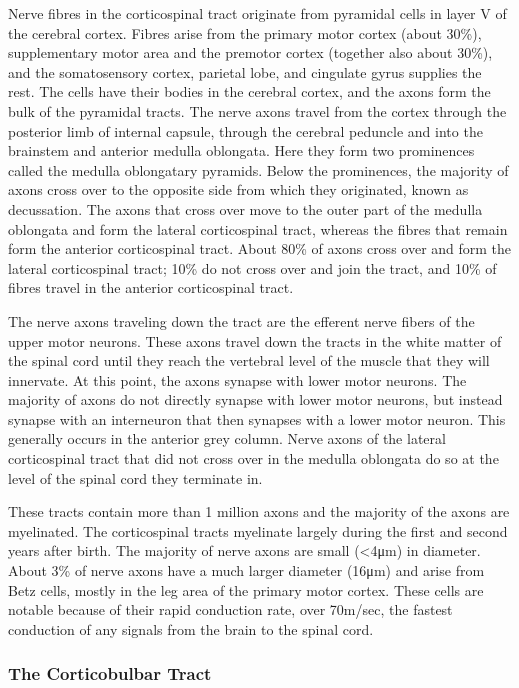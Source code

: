 Nerve fibres in the corticospinal tract originate from pyramidal cells in layer V of the cerebral cortex. Fibres arise from the primary motor cortex (about 30\%), supplementary motor area and the premotor cortex (together also about 30\%), and the somatosensory cortex, parietal lobe, and cingulate gyrus supplies the rest. The cells have their bodies in the cerebral cortex, and the axons form the bulk of the pyramidal tracts. The nerve axons travel from the cortex through the posterior limb of internal capsule, through the cerebral peduncle and into the brainstem and anterior medulla oblongata. Here they form two prominences called the medulla oblongatary pyramids. Below the prominences, the majority of axons cross over to the opposite side from which they originated, known as decussation. The axons that cross over move to the outer part of the medulla oblongata and form the lateral corticospinal tract, whereas the fibres that remain form the anterior corticospinal tract. About 80\% of axons cross over and form the lateral corticospinal tract; 10\% do not cross over and join the tract, and 10\% of fibres travel in the anterior corticospinal tract.

The nerve axons traveling down the tract are the efferent nerve fibers of the upper motor neurons. These axons travel down the tracts in the white matter of the spinal cord until they reach the vertebral level of the muscle that they will innervate. At this point, the axons synapse with lower motor neurons. The majority of axons do not directly synapse with lower motor neurons, but instead synapse with an interneuron that then synapses with a lower motor neuron. This generally occurs in the anterior grey column. Nerve axons of the lateral corticospinal tract that did not cross over in the medulla oblongata do so at the level of the spinal cord they terminate in.

These tracts contain more than 1 million axons and the majority of the axons are myelinated. The corticospinal tracts myelinate largely during the first and second years after birth. The majority of nerve axons are small (\textless{}4μm) in diameter. About 3\% of nerve axons have a much larger diameter (16μm) and arise from Betz cells, mostly in the leg area of the primary motor cortex. These cells are notable because of their rapid conduction rate, over 70m/sec, the fastest conduction of any signals from the brain to the spinal cord.

\hypertarget{the-corticobulbar-tract}{%
\subsubsection{The Corticobulbar Tract}\label{the-corticobulbar-tract}}

